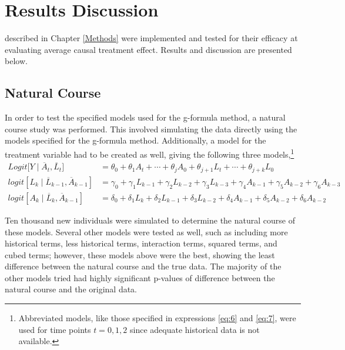 
\chapter{Results Discussion} \label{Results}

 described in Chapter \ref{Methods} were implemented and tested for their efficacy at evaluating average causal treatment effect.  Results and discussion are presented below.  

\section{Natural Course} 
In order to test the specified models used for the g-formula method, a natural course study was performed.  This involved simulating the data directly using the models specified for the g-formula method.  Additionally, a model for the treatment variable had to be created as well, giving the following three models,\footnote{Abbreviated models, like those specified in expressions \ref{eq:6} and \ref{eq:7}, were used for time points $t=0,1,2$ since adequate historical data is not available.} 
\begin{align} 
Logit \big[Y \mid \overline{A}_t, \overline{L}_t \big] &= \theta_{0} + \theta_1 A_{t} + \cdots + \theta_j A_0 + \theta_{j+1} L_t + \cdots + \theta_{j+k} L_0  \label{eq:12} \\ 
logit[L_k \mid \overline{L}_{k-1}, \overline{A}_{k-1}] &= \gamma_0 + \gamma_1 L_{k-1} + \gamma_2 L_{k-2} + \gamma_3 L_{k-3}  + \gamma_4 A_{k-1} + \gamma_5 A_{k-2} + \gamma_6 A_{k-3} \label{eq:13} \\ 
logit[A_k \mid \overline{L}_{k}, \overline{A}_{k-1}] &= \delta_0 + \delta_1 L_{k} + \delta_2 L_{k-1} + \delta_3 L_{k-2}  + \delta_4 A_{k-1} + \delta_5 A_{k-2} + \delta_6 A_{k-2} \label{eq:14}
\end{align} 

Ten thousand new individuals were simulated to determine the natural course of these models.  Several other models were tested as well, such as including more historical terms, less historical terms, interaction terms, squared terms, and cubed terms; however, these models above were the best, showing the least difference between the natural course and the true data.  The majority of the other models tried had highly significant p-values of difference between the natural course and the original data.  

